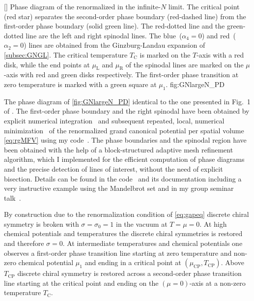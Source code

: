 	[]%
	{%
		Phase diagram of the renormalized \gnm{} in the infinite-$N$ limit. The critical point (red star) separates the second-order phase boundary (red-dashed line) from the first-order phase boundary (solid green line). The red-dotted line and the green-dotted line are the left and right spinodal lines. 
		The {blue}\ ($\alpha_4=0$) and  {red}\ ($\alpha_2=0$) lines are obtained from the Ginzburg-Landau expansion of \cref{subsec:GNGL}. 
		The critical temperature $T_\mathrm{C}$ is marked on the $T$-axis with a red disk, while the end points at $\mu_\mathrm{L}$ and $\mu_\mathrm{R}$ of the spinodal lines are marked on the $\mu$-axis with red and green disks respectively. The first-order phase transition at zero temperature is marked with a green square at $\mu_1$.
	}%
	{fig:GNlargeN_PD}%

The phase diagram of \cref{fig:GNlargeN_PD} identical to the one presented in Fig.~1 of . 
The first-order phase boundary and the right spinodal have been obtained by explicit numerical integration~\cite{cubature:2020} and subsequent repeated, local, numerical minimization~\cite{Nelder:1965} of the renormalized grand canonical potential per spatial volume \eqref{eq:rgMFV} using my \Cpp{} code~\cite{Steil:2023GNcpp}.
The phase boundaries and the spinodal region have been obtained with the help of a block-structured adaptive mesh refinement algorithm, which I implemented for the efficient computation of phase diagrams and the precise detection of lines of interest, without the need of explicit bisection.
Details can be found in the \Cpp{} code~\cite{Steil:2023GNcpp} and its documentation \dash{} including a very instructive example using the Mandelbrot set \dash{} and in my group seminar talk~\cite{Steil:2020bsam}.

By construction \dash{} due to the renormalization condition of \cref{eq:gapeq} \dash{} discrete chiral symmetry is broken with $\sigma=\sigma_0=1$ in the vacuum at $T=\mu=0$.
At high chemical potentials and temperatures the discrete chiral symmetries is restored and therefore $\sigma=0$.
At intermediate temperatures and chemical potentials one observes a first-order phase transition line starting at zero temperature and non-zero chemical potential $\mu_1$ and ending in a critical point at $( \mu_{\mathrm{CP}}, T_{\mathrm{CP}} )$.
Above $T_{\mathrm{CP}}$ discrete chiral symmetry is restored across a second-order phase transition line starting at the critical point and ending on the $(\mu=0)$-axis at a non-zero temperature $T_\mathrm{C}$.

